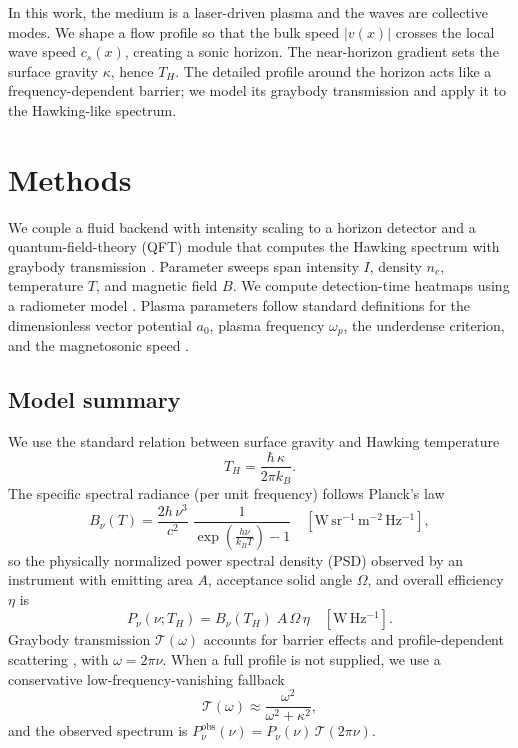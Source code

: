 \documentclass[11pt]{article}
\begin{document}
In this work, the medium is a laser-driven plasma and the waves are collective modes. We shape a flow profile so that the bulk speed $|v(x)|$ crosses the local wave speed $c_s(x)$, creating a sonic horizon. The near-horizon gradient sets the surface gravity $\kappa$, hence $T_H$. The detailed profile around the horizon acts like a frequency-dependent barrier; we model its graybody transmission and apply it to the Hawking-like spectrum.

\section{Methods}
We couple a fluid backend with intensity scaling to a horizon detector and a quantum-field-theory (QFT) module that computes the Hawking spectrum with graybody transmission \cite{Planck1901,Page1976}. Parameter sweeps span intensity $I$, density $n_e$, temperature $T$, and magnetic field $B$. We compute detection-time heatmaps using a radiometer model \cite{Wilson2013}.
Plasma parameters follow standard definitions for the dimensionless vector potential $a_0$, plasma frequency $\omega_p$, the underdense criterion, and the magnetosonic speed \cite{Esarey2009,Chen2016}.

\subsection{Model summary}
We use the standard relation between surface gravity and Hawking temperature
\begin{equation}
  T_H = \frac{\hbar\,\kappa}{2\pi k_B}.
\end{equation}
The specific spectral radiance (per unit frequency) follows Planck's law
\begin{equation}
  B_{\nu}(T) = \frac{2 h \, \nu^3}{c^2} \; \frac{1}{\exp\!\left(\tfrac{h\nu}{k_B T}\right) - 1} \quad [\mathrm{W\,sr^{-1}\,m^{-2}\,Hz^{-1}}],
\end{equation}
so the physically normalized power spectral density (PSD) observed by an instrument with emitting area $A$, acceptance solid angle $\Omega$, and overall efficiency $\eta$ is
\begin{equation}
  P_{\nu}(\nu; T_H) = B_{\nu}(T_H) \; A\,\Omega\,\eta \quad [\mathrm{W\,Hz^{-1}}].
\end{equation}
Graybody transmission $\mathcal{T}(\omega)$ accounts for barrier effects and profile-dependent scattering \cite{Page1976}, with $\omega = 2\pi\nu$. When a full profile is not supplied, we use a conservative low-frequency-vanishing fallback
\begin{equation}
  \mathcal{T}(\omega) \approx \frac{\omega^2}{\omega^2 + \kappa^2},
\end{equation}
and the observed spectrum is $P^{\mathrm{obs}}_{\nu}(\nu) = P_{\nu}(\nu)\,\mathcal{T}(2\pi\nu)$.
\end{document}
